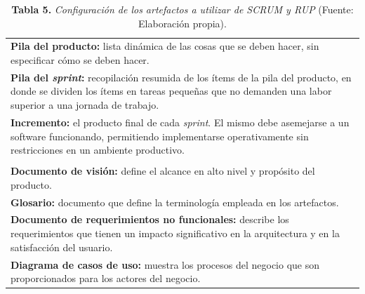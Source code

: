 \FloatBarrier %
		\begin{table}[htb]
			\small
			\centering
			\setlength{\extrarowheight}{5pt}
			\begin{tabulary}{15cm}{|J|}
				\hline
				\\ \hline
				\textbf{Pila del producto: }lista din\'{a}mica de las cosas que se deben hacer, sin especificar c\'{o}mo se deben hacer.\\ \hline
				\textbf{Pila del \textit{sprint}:} recopilaci\'{o}n resumida de los \'{i}tems de la pila del producto, en donde se dividen los \'{i}tems en tareas peque\~{n}as que no demanden una labor superior a una jornada de trabajo.\\ \hline
				\textbf{Incremento: }el producto final de cada \textit{sprint}. El mismo debe asemejarse a un software funcionando, permitiendo implementarse operativamente sin restricciones en un ambiente productivo.\\ \hline
				\\ \hline
				\textbf{Documento de visi\'{o}n: }define el alcance en alto nivel y prop\'{o}sito del producto.\\
\hline
				\textbf{Glosario: }documento que define la terminolog\'{i}a empleada en los artefactos.\\ \hline
				\textbf{Documento de requerimientos no funcionales: }describe los requerimientos que tienen un impacto significativo en la arquitectura y en la satisfacci\'{o}n del usuario.\\ \hline
		\textbf{Diagrama de casos de uso: }muestra los procesos del negocio que son proporcionados para los actores del negocio.\\ \hline
			\end{tabulary}
			\caption{\textbf{Tabla 5.} \textit{Configuraci\'{o}n de los artefactos a utilizar de SCRUM y RUP} (Fuente: Elaboraci\'{o}n propia).}
		\end{table}
\FloatBarrier %